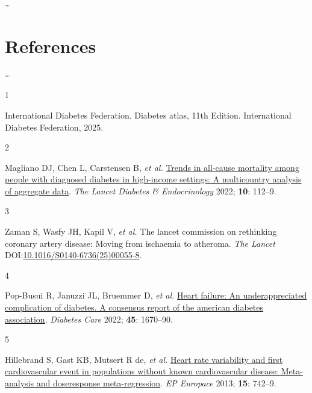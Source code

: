 \documentclass[
  a4paper,
  headsepline=true,
  open=any]{scrbook}
\newlength{\cslhangindent}
\newlength{\csllabelwidth}
\newlength{\cslentryspacingunit} %
\newenvironment{CSLReferences}[2] %
 {%
  \setlength{\parindent}{0pt}
  \ifodd #1
  \let\oldpar\par
  \def\par{\hangindent=\cslhangindent\oldpar}
  \fi
  \setlength{\parskip}{#2\cslentryspacingunit}
 }%
 {}
\newcommand{\CSLLeftMargin}[1]{\parbox[t]{\csllabelwidth}{#1}}
\newcommand{\CSLRightInline}[1]{\parbox[t]{\linewidth - \csllabelwidth}{#1}\break}
\begin{document}
\newpage

\thispagestyle{empty}

\textasciitilde{} \newpage


\hypertarget{references}{%
\chapter*{References}\label{references}}


\newpage

\thispagestyle{empty}

\textasciitilde{} \newpage

\hypertarget{refs}{}
\begin{CSLReferences}{0}{0}
\leavevmode{}%
\CSLLeftMargin{1 }%
\CSLRightInline{International Diabetes Federation. Diabetes atlas, 11th
Edition. International Diabetes Federation, 2025.}

\leavevmode{}%
\CSLLeftMargin{2 }%
\CSLRightInline{Magliano DJ, Chen L, Carstensen B, \emph{et al.}
\href{https://doi.org/10.1016/S2213-8587(21)00327-2}{Trends in all-cause
mortality among people with diagnosed diabetes in high-income settings:
A multicountry analysis of aggregate data}. \emph{The Lancet Diabetes \&
Endocrinology} 2022; \textbf{10}: 112--9.}

\leavevmode{}%
\CSLLeftMargin{3 }%
\CSLRightInline{Zaman S, Wasfy JH, Kapil V, \emph{et al.} The lancet
commission on rethinking coronary artery disease: Moving from ischaemia
to atheroma. \emph{The Lancet}
DOI:\href{https://doi.org/10.1016/S0140-6736(25)00055-8}{10.1016/S0140-6736(25)00055-8}.}

\leavevmode{}%
\CSLLeftMargin{4 }%
\CSLRightInline{Pop-Busui R, Januzzi JL, Bruemmer D, \emph{et al.}
\href{https://doi.org/10.2337/dci22-0014}{Heart failure: An
underappreciated complication of diabetes. A consensus report of the
american diabetes association}. \emph{Diabetes Care} 2022; \textbf{45}:
1670--90.}

\leavevmode{}%
\CSLLeftMargin{5 }%
\CSLRightInline{Hillebrand S, Gast KB, Mutsert R de, \emph{et al.}
\href{https://doi.org/10.1093/europace/eus341}{Heart rate variability
and first cardiovascular event in populations without known
cardiovascular disease: Meta-analysis and dose{\textendash}response
meta-regression}. \emph{EP Europace} 2013; \textbf{15}: 742--9.}


\end{CSLReferences}
\end{document}
